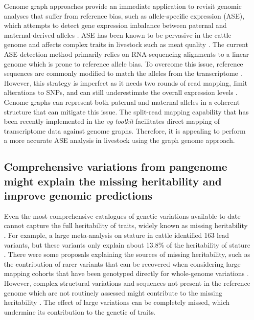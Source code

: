 \documentclass[../main.tex]{subfiles}
\begin{document}
Genome graph approaches provide an immediate application to revisit genomic analyses that suffer from reference bias, such as allele-specific expression (ASE), which attempts to detect gene expression imbalance between paternal and maternal-derived alleles \citep{castel2020vast}. ASE has been known to be pervasive in the cattle genome \citep{chamberlain2015extensive} and affects complex traits in livestock such as meat quality \citep{guillocheau2019survey,bruscadin2021muscle}. The current ASE detection method primarily relies on RNA-sequencing alignments to a linear genome which is prone to reference allele bias. To overcome this issue, reference sequences are commonly modified to match the alleles from the transcriptome \citep{salavati2019elimination}. However, this strategy is imperfect as it needs two rounds of read mapping, limit alterations to SNPs, and can still underestimate the overall expression levels \citep{van2015wasp}. Genome graphs can represent both paternal and maternal alleles in a coherent structure that can mitigate this issue. The split-read mapping capability that has been recently implemented in the \emph{vg toolkit} \citep{Sibbesen2021} facilitates direct mapping of transcriptome data against genome graphs. Therefore, it is appealing to perform a more accurate ASE analysis in livestock using the graph genome approach. 

\subsection*{Comprehensive variations from pangenome might explain the missing heritability and improve genomic predictions}

Even the most comprehensive catalogues of genetic variations available to date cannot capture the full heritability of traits, widely known as missing heritability \citep{maher2008personal}. For example, a large meta-analysis on stature in cattle identified 163 lead variants, but these variants only explain about 13.8\% of the heritability of stature \citep{bouwman2018meta}. There were some proposals explaining the sources of missing heritability, such as the contribution of rarer variants \citep{gonzalez2015rare} that can be recovered when considering large mapping cohorts that have been genotyped directly for whole-genome variations \citep{wainschtein2019recovery}. However, complex structural variations and sequences not present in the reference genome which are not routinely assessed might contribute to the missing heritability \citep{genin2020missing,theunissen2020structural}. The effect of large variations can be completely missed, which undermine its contribution to the genetic of traits. 
\end{document}

